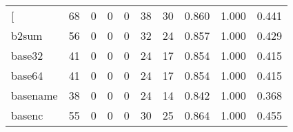 \begin{longtable}{lp{1.3cm}p{1.3cm}p{1.3cm}p{1.3cm}p{1.3cm}p{1.3cm}p{1.3cm}p{1.3cm}p{1.3cm}}
\bottomrule
\endlastfoot
{[}         &                     68 &                                             0 &                                            0 &                                           0 &                                           38 &                                         30 &                                0.860 &                                  1.000 &                                0.441 \\
b2sum     &                     56 &                                             0 &                                            0 &                                           0 &                                           32 &                                         24 &                                0.857 &                                  1.000 &                                0.429 \\
base32    &                     41 &                                             0 &                                            0 &                                           0 &                                           24 &                                         17 &                                0.854 &                                  1.000 &                                0.415 \\
base64    &                     41 &                                             0 &                                            0 &                                           0 &                                           24 &                                         17 &                                0.854 &                                  1.000 &                                0.415 \\
basename  &                     38 &                                             0 &                                            0 &                                           0 &                                           24 &                                         14 &                                0.842 &                                  1.000 &                                0.368 \\
basenc    &                     55 &                                             0 &                                            0 &                                           0 &                                           30 &                                         25 &                                0.864 &                                  1.000 &                                0.455 \\

\end{longtable}

